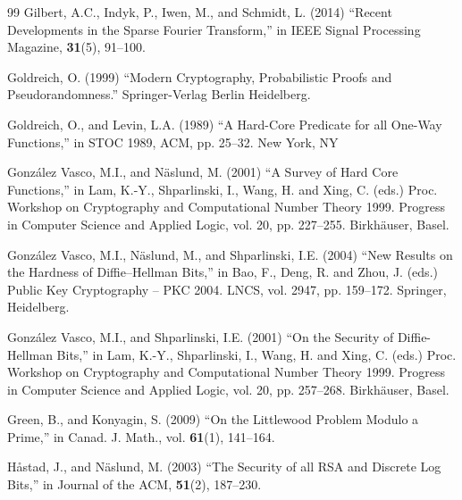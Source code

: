 \documentclass[11pt]{article}
\theoremstyle{definition}
\begin{document}
\begin{thebibliography}{99}
    {Gilbert, A.C., Indyk, P., Iwen, M., and Schmidt, L. (2014)
        ``Recent Developments in the Sparse Fourier Transform,'' in IEEE Signal Processing Magazine, \textbf{31}(5), 91--100.}

    {Goldreich, O. (1999)
        ``Modern Cryptography, Probabilistic Proofs and Pseudorandomness.'' Springer-Verlag Berlin Heidelberg.}

    {Goldreich, O., and Levin, L.A. (1989)
        ``A Hard-Core Predicate for all One-Way Functions,'' in STOC 1989, ACM, pp. 25--32. New York, NY}

    {Gonz{\'a}lez Vasco, M.I., and N{\"a}slund, M. (2001)
    ``A Survey of Hard Core Functions,'' in Lam, K.-Y., Shparlinski, I., Wang, H. and Xing, C. (eds.) Proc. Workshop on Cryptography and Computational Number Theory 1999. Progress in Computer Science and Applied Logic, vol. 20, pp. 227--255. Birkh\"{a}user, Basel.}

    {Gonz{\'a}lez Vasco, M.I., N{\"a}slund, M., and Shparlinski, I.E. (2004)
        ``New Results on the Hardness of Diffie--Hellman Bits,'' in Bao, F., Deng, R. and Zhou, J. (eds.) Public Key Cryptography -- PKC 2004. LNCS, vol. 2947, pp. 159--172. Springer, Heidelberg.}

    {Gonz{\'a}lez Vasco, M.I., and Shparlinski, I.E. (2001)
    ``On the Security of Diffie-Hellman Bits,''  in Lam, K.-Y., Shparlinski, I., Wang, H. and Xing, C. (eds.) Proc. Workshop on Cryptography and Computational Number Theory 1999. Progress in Computer Science and Applied Logic, vol. 20, pp. 257--268. Birkh\"{a}user, Basel.}

    {Green, B., and Konyagin, S. (2009)
        ``On the Littlewood Problem Modulo a Prime,'' in Canad. J. Math., vol. \textbf{61}(1), 141--164.}

    {H\r{a}stad, J., and N{\"a}slund, M. (2003)
        ``The Security of all RSA and Discrete Log Bits,'' in Journal of the ACM, \textbf{51}(2), 187--230.}




\end{thebibliography}
\end{document}
